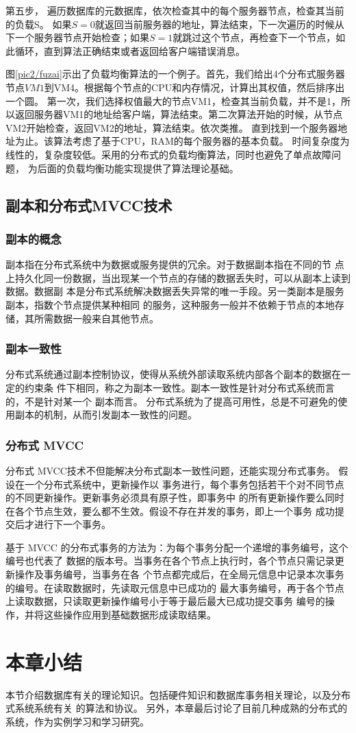 第五步，
遍历数据库的元数据库，依次检查其中的每个服务器节点，检查其当前的负载S。
如果$ S=0 $就返回当前服务器的地址，算法结束，下一次遍历的时候从下一个服务器节点开始检查；如果$ S=1 $就跳过这个节点，再检查下一个节点，如此循环，直到算法正确结束或者返回给客户端错误消息。

图\ref{pic2/fuzai}示出了负载均衡算法的一个例子。首先，我们给出4个分布式服务器节点$ VM1 $到VM4。根据每个节点的CPU和内存情况，计算出其权值，然后排序出一个圆。
第一次，我们选择权值最大的节点VM1，检查其当前负载，并不是1，所以返回服务器VM1的地址给客户端，算法结束。第二次算法开始的时候，从节点VM2开始检查，返回VM2的地址，算法结束。依次类推。
直到找到一个服务器地址为止。该算法考虑了基于CPU，RAM的每个服务器的基本负载。
时间复杂度为线性的，复杂度较低。采用的分布式的负载均衡算法，同时也避免了单点故障问题，
为后面的负载均衡功能实现提供了算法理论基础。
\subsection{副本和分布式MVCC技术}
\subsubsection{副本的概念}
副本指在分布式系统中为数据或服务提供的冗余。对于数据副本指在不同的节
点上持久化同一份数据，当出现某一个节点的存储的数据丢失时，可以从副本上读到数据。数据副
本是分布式系统解决数据丢失异常的唯一手段。另一类副本是服务副本，指数个节点提供某种相同
的服务，这种服务一般并不依赖于节点的本地存储，其所需数据一般来自其他节点。
\subsubsection{副本一致性}
分布式系统通过副本控制协议，使得从系统外部读取系统内部各个副本的数据在一定的约束条
件下相同，称之为副本一致性。副本一致性是针对分布式系统而言的，不是针对某一个
副本而言。
分布式系统为了提高可用性，总是不可避免的使用副本的机制，从而引发副本一致性的问题。
\subsubsection{分布式 MVCC}
分布式 MVCC技术不但能解决分布式副本一致性问题，还能实现分布式事务。
假设在一个分布式系统中，更新操作以
事务进行，每个事务包括若干个对不同节点的不同更新操作。更新事务必须具有原子性，即事务中
的所有更新操作要么同时在各个节点生效，要么都不生效。假设不存在并发的事务，即上一个事务
成功提交后才进行下一个事务。

基于 MVCC 的分布式事务的方法为：为每个事务分配一个递增的事务编号，这个编号也代表了
数据的版本号。当事务在各个节点上执行时，各个节点只需记录更新操作及事务编号，当事务在各
个节点都完成后，在全局元信息中记录本次事务的编号。在读取数据时，先读取元信息中已成功的
最大事务编号，再于各个节点上读取数据，只读取更新操作编号小于等于最后最大已成功提交事务
编号的操作，并将这些操作应用到基础数据形成读取结果。
\section{本章小结}
本节介绍数据库有关的理论知识。包括硬件知识和数据库事务相关理论，以及分布式系统系统有关
的算法和协议。
另外，本章最后讨论了目前几种成熟的分布式的系统，作为实例学习和学习研究。